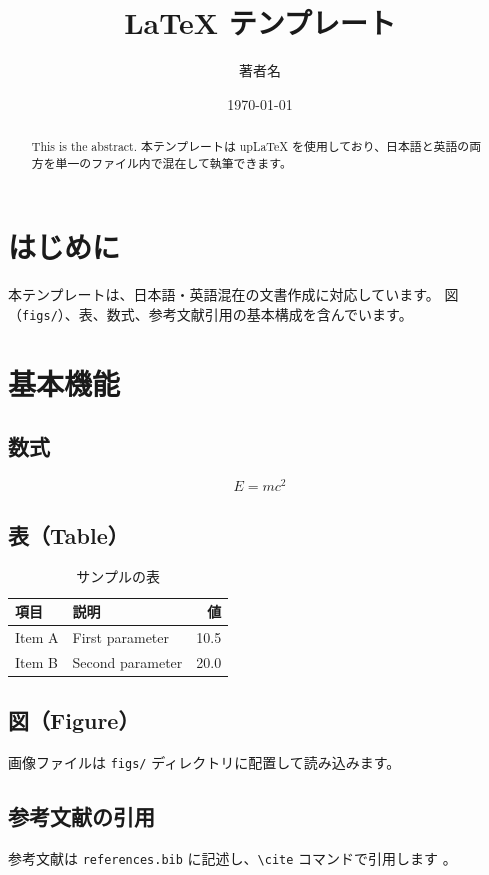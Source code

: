 \documentclass[uplatex,a4paper,11pt,dvipdfmx]{jsarticle}
\title{LaTeX テンプレート}
\author{著者名}
\date{\today}
\begin{document}
\maketitle

\begin{abstract}
This is the abstract. 本テンプレートは up\LaTeX{} を使用しており、日本語と英語の両方を単一のファイル内で混在して執筆できます。
\end{abstract}

\section{はじめに}
本テンプレートは、日本語・英語混在の文書作成に対応しています。
図（\texttt{figs/}）、表、数式、参考文献引用の基本構成を含んでいます。

\section{基本機能}

\subsection{数式}
\begin{equation}
  E = mc^2
\end{equation}

\subsection{表（Table）}
\begin{table}[htbp]
  \centering
  \caption{サンプルの表}
  \label{tab:sample}
  \begin{tabular}{llr}
    \toprule
    項目 & 説明 & 値 \\
    \midrule
    Item A & First parameter  & 10.5 \\
    Item B & Second parameter & 20.0 \\
    \bottomrule
  \end{tabular}
\end{table}

\subsection{図（Figure）}
画像ファイルは \texttt{figs/} ディレクトリに配置して読み込みます。

\subsection{参考文献の引用}
参考文献は \texttt{references.bib} に記述し、\texttt{\textbackslash cite} コマンドで引用します \cite{example2024}。



\end{document}
